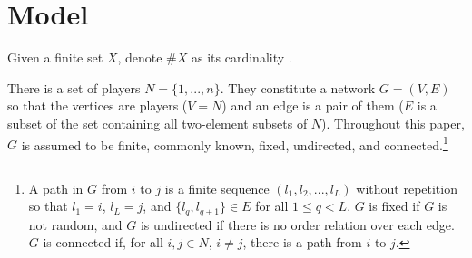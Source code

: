 \documentclass[12pt,letter]{article}
\theoremstyle{definition}
\theoremstyle{remark}
\theoremstyle{claim}
\begin{document}
%
%
%
%

\section{Model}
\label{sec:model}
Given a finite set $X$, denote $\#X$ as its cardinality . 



There is a set of players $N=\{1,...,n\}$. They constitute a network $G=(V,E)$ so that the vertices are players ($V=N$) and an edge is a pair of them ($E$ is a subset of the set containing all two-element subsets of $N$). Throughout this paper, $G$ is assumed to be finite, commonly known, fixed, undirected, and connected.\footnote{A path in $G$ from $i$ to $j$ is a finite sequence $(l_1,l_2,...,l_L)$ without repetition so that $l_1=i$, $l_L=j$, and $\{l_q,l_{q+1}\}\in E$ for all $1\leq q<L$. $G$ is fixed if $G$ is not random, and $G$ is undirected if there is no order relation over each edge. $G$ is connected if, for all $i,j\in N$, $i\neq j$, there is a path from $i$ to $j$.}
\end{document}

